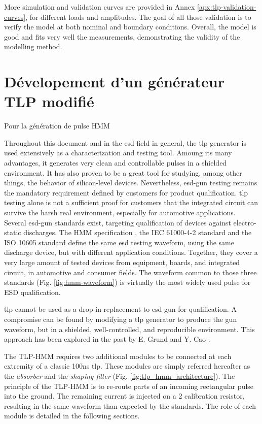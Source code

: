 More simulation and validation curves are provided in Annex \ref{apx:tlp-validation-curves}, for different loads and amplitudes.
The goal of all those validation is to verify the model at both nominal and boundary conditions.
Overall, the model is good and fits very well the measurements, demonstrating the validity of the modelling method.

\section{Dévelopement d'un générateur TLP modifié}

Pour la génération de pulse HMM

Throughout this document and in the \gls{esd} field in general, the \gls{tlp} generator is used extensively as a characterization and testing tool.
Amoung its many advantages, it generates very clean and controllable pulses in a shielded environment.
It has also proven to be a great tool for studying, among other things, the behavior of silicon-level devices.
Nevertheless, \gls{esd-gun} testing remains the mandatory requirement defined by customers for product qualification.
\gls{tlp} testing alone is not a sufficient proof for customers that the integrated circuit can survive the harsh real environment, especially for automotive applications.
Several \gls{esd-gun} standards exist, targeting qualification of devices against electro-static discharges.
The HMM specification \cite{hmm}, the IEC 61000-4-2 standard \cite{iec61000-4-2} and the ISO 10605 standard \cite{iso10605} define the same \gls{esd} testing waveform, using the same discharge device, but with different application conditions.
Together, they cover a very large amount of tested devices from equipment, boards, and integrated circuit, in automotive and consumer fields.
The waveform common to those three standards (Fig. \ref{fig:hmm-waveform}) is virtually the most widely used pulse for ESD qualification.

\gls{tlp} cannot be used as a drop-in replacement to \gls{esd} gun for qualification.
A compromise can be found by modifying a \gls{tlp} generator to produce the gun waveform, but in a shielded, well-controlled, and reproducible environment.
This approach has been explored in the past by E. Grund \cite{iec61000-tlp} and Y. Cao \cite{tlp-based-hmm}.

The TLP-HMM requires two additional modules to be connected at each extremity of a classic 100ns \gls{tlp}.
These modules are simply referred hereafter as the \textit{absorber} and the \textit{shaping filter} (Fig. \ref{fig:tlp_hmm_architecture}).
The principle of the TLP-HMM is to re-route parts of an incoming rectangular pulse into the ground.
The remaining current is injected on a 2\textOmega{} calibration resistor, resulting in the same waveform than expected by the standards.
The role of each module is detailed in the following sections.

